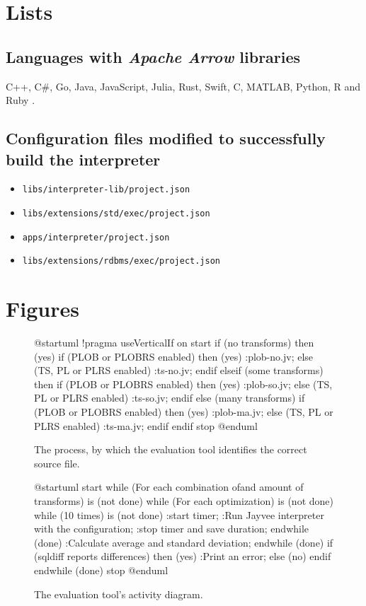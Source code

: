 \section{Lists}
\subsection{Languages with \emph{Apache Arrow} libraries}
\label{subsubsection:arrow:langs}
C++, C\#, Go, Java, JavaScript, Julia, Rust, Swift, C, MATLAB, Python, R and Ruby \autocite{arrow:overview}.

\subsection{Configuration files modified to successfully build the interpreter}
\label{list:project:jsons}
\begin{itemize}
	\item \Verb|libs/interpreter-lib/project.json|
	\item \Verb|libs/extensions/std/exec/project.json|
	\item \Verb|apps/interpreter/project.json|
	\item \Verb|libs/extensions/rdbms/exec/project.json|
\end{itemize}

\section{Figures}

\begin{figure}[H]
	\begin{plantuml}
		@startuml
		!pragma useVerticalIf on
		start
		if (no transforms) then (yes)
		if (PLOB or PLOBRS enabled) then (yes)
		:plob-no.jv;
		else (TS, PL or PLRS enabled)
		:ts-no.jv;
		endif
		elseif (some transforms) then
		if (PLOB or PLOBRS enabled) then (yes)
		:plob-so.jv;
		else (TS, PL or PLRS enabled)
		:ts-so.jv;
		endif
		else (many transforms)
		if (PLOB or PLOBRS enabled) then (yes)
		:plob-ma.jv;
		else (TS, PL or PLRS enabled)
		:ts-ma.jv;
		endif
		endif
		stop
		@enduml
	\end{plantuml}
	\caption{The process, by which the evaluation tool identifies the correct source file.}
	\label{fig:uml:pick-jv-model}
\end{figure}

\begin{figure}[H]
	\begin{plantuml}
		@startuml
		start
		while (For each combination of\nrowcount and amount of transforms) is (not done)
		while (For each optimization) is (not done)
		while (10 times) is (not done)
		:start timer;
		:Run Jayvee interpreter with the configuration;
		:stop timer and save duration;
		endwhile (done)
		:Calculate average and
		standard deviation;
		endwhile (done)
		if (sqldiff reports differences) then (yes)
		:Print an error;
		else (no)
		endif
		endwhile (done)
		stop
		@enduml
	\end{plantuml}
	\caption{The evaluation tool's activity diagram.}
	\label{fig:uml:evalation-tool}
\end{figure}



